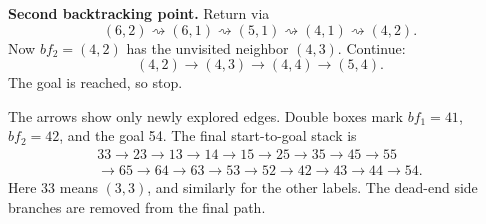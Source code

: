 \documentclass[11pt,a4paper]{article}
\begin{document}
\textbf{Second backtracking point.} Return via
\[
(6,2)\rightsquigarrow(6,1)\rightsquigarrow(5,1)\rightsquigarrow(4,1)\rightsquigarrow(4,2).
\]
Now $\boxed{bf_2=(4,2)}$ has the unvisited neighbor $(4,3)$. Continue:
\[
(4,2)\to(4,3)\to(4,4)\to\boxed{(5,4)}.
\]
The goal is reached, so stop.

\begin{center}\end{center}
The arrows show only newly explored edges. Double boxes mark $bf_1=41$, $bf_2=42$, and the goal 54. The final start-to-goal stack is
\begin{align*}
33\to23\to13\to14\to15\to25\to35\to45\to55\\
\to65\to64\to63\to53\to52\to42\to43\to44\to54.
\end{align*}
Here $33$ means $(3,3)$, and similarly for the other labels. The dead-end side branches are removed from the final path.
\end{document}
